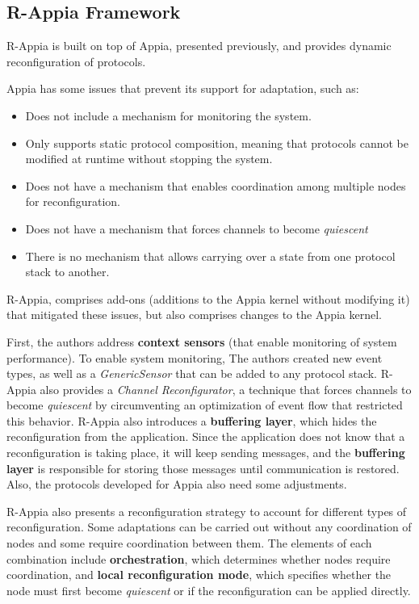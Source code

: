 \subsection{R-Appia Framework}
\label{ssec:rappiaframework}
\par R-Appia \cite{Rosa2007} is built on top of Appia, presented previously, and provides dynamic reconfiguration of protocols.
\par Appia has some issues that prevent its support for adaptation, such as:
\begin{itemize}
	\item Does not include a mechanism for monitoring the system.
	\item Only supports static protocol composition, meaning that protocols cannot be modified at runtime without stopping the system.
	\item Does not have a mechanism that enables coordination among multiple nodes for reconfiguration.
	\item Does not have a mechanism that forces channels to become \textit{quiescent} 
	\item There is no mechanism that allows carrying over a state from one protocol stack to another.
\end{itemize}
\par R-Appia, comprises add-ons (additions to the Appia kernel without modifying it) that mitigated these issues, but also comprises changes to the Appia kernel.
\par First, the authors address \textbf{context sensors} (that enable monitoring of system performance). To enable system monitoring, The authors created new event types, as well as a \textit{GenericSensor} that can be added to any protocol stack. R-Appia also provides a \textit{Channel Reconfigurator}, a technique that forces channels to become \textit{quiescent} by circumventing an optimization of event flow that restricted this behavior. R-Appia also introduces a \textbf{buffering layer}, which hides the reconfiguration from the application. Since the application does not know that a reconfiguration is taking place, it will keep sending messages, and the \textbf{buffering layer} is responsible for storing those messages until communication is restored. Also, the protocols developed for Appia also need some adjustments.
\par R-Appia also presents a reconfiguration strategy to account for different types of reconfiguration. Some adaptations can be carried out  without any coordination of nodes and some require coordination between them. The elements of each combination include \textbf{orchestration}, which determines whether nodes require coordination, and \textbf{local reconfiguration mode}, which specifies whether the node must first become \textit{quiescent} or if the reconfiguration can be applied directly.
